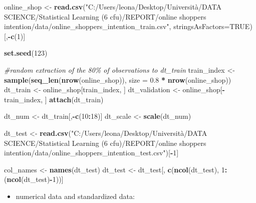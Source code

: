 \documentclass[
]{article}
\newenvironment{Shaded}{\begin{snugshade}}{\end{snugshade}}
\newcommand{\AttributeTok}[1]{\textcolor[rgb]{0.13,0.29,0.53}{#1}}
\newcommand{\CommentTok}[1]{\textcolor[rgb]{0.56,0.35,0.01}{\textit{#1}}}
\newcommand{\ConstantTok}[1]{\textcolor[rgb]{0.56,0.35,0.01}{#1}}
\newcommand{\DecValTok}[1]{\textcolor[rgb]{0.00,0.00,0.81}{#1}}
\newcommand{\FloatTok}[1]{\textcolor[rgb]{0.00,0.00,0.81}{#1}}
\newcommand{\FunctionTok}[1]{\textcolor[rgb]{0.13,0.29,0.53}{\textbf{#1}}}
\newcommand{\NormalTok}[1]{#1}
\newcommand{\OtherTok}[1]{\textcolor[rgb]{0.56,0.35,0.01}{#1}}
\newcommand{\SpecialCharTok}[1]{\textcolor[rgb]{0.81,0.36,0.00}{\textbf{#1}}}
\newcommand{\StringTok}[1]{\textcolor[rgb]{0.31,0.60,0.02}{#1}}
\providecommand{\tightlist}{%
  \setlength{\itemsep}{0pt}\setlength{\parskip}{0pt}}
\begin{document}
\begin{Shaded}
\begin{Highlighting}[]
\NormalTok{online\_shop }\OtherTok{\textless{}{-}} \FunctionTok{read.csv}\NormalTok{(}\StringTok{"C:/Users/leona/Desktop/Università/DATA SCIENCE/Statistical Learning (6 cfu)/REPORT/online shoppers intention/data/online\_shoppers\_intention\_train.csv"}\NormalTok{, }\AttributeTok{stringsAsFactors=}\ConstantTok{TRUE}\NormalTok{)[,}\SpecialCharTok{{-}}\FunctionTok{c}\NormalTok{(}\DecValTok{1}\NormalTok{)]}

\FunctionTok{set.seed}\NormalTok{(}\DecValTok{123}\NormalTok{)}

\CommentTok{\#random extraction of the 80\% of observations to dt\_train}
\NormalTok{train\_index }\OtherTok{\textless{}{-}} \FunctionTok{sample}\NormalTok{(}\FunctionTok{seq\_len}\NormalTok{(}\FunctionTok{nrow}\NormalTok{(online\_shop)), }\AttributeTok{size =} \FloatTok{0.8} \SpecialCharTok{*} \FunctionTok{nrow}\NormalTok{(online\_shop))}
\NormalTok{dt\_train }\OtherTok{\textless{}{-}}\NormalTok{ online\_shop[train\_index, ]}
\NormalTok{dt\_validation }\OtherTok{\textless{}{-}}\NormalTok{ online\_shop[}\SpecialCharTok{{-}}\NormalTok{train\_index, ]}
\FunctionTok{attach}\NormalTok{(dt\_train)}

\NormalTok{dt\_num }\OtherTok{\textless{}{-}}\NormalTok{  dt\_train[,}\SpecialCharTok{{-}}\FunctionTok{c}\NormalTok{(}\DecValTok{10}\SpecialCharTok{:}\DecValTok{18}\NormalTok{)]}
\NormalTok{dt\_scale }\OtherTok{\textless{}{-}} \FunctionTok{scale}\NormalTok{(dt\_num)}


\NormalTok{dt\_test }\OtherTok{\textless{}{-}} \FunctionTok{read.csv}\NormalTok{(}\StringTok{"C:/Users/leona/Desktop/Università/DATA SCIENCE/Statistical Learning (6 cfu)/REPORT/online shoppers intention/data/online\_shoppers\_intention\_test.csv"}\NormalTok{)[}\SpecialCharTok{{-}}\DecValTok{1}\NormalTok{]}

\NormalTok{col\_names }\OtherTok{\textless{}{-}} \FunctionTok{names}\NormalTok{(dt\_test)}
\NormalTok{dt\_test }\OtherTok{\textless{}{-}}\NormalTok{ dt\_test[, }\FunctionTok{c}\NormalTok{(}\FunctionTok{ncol}\NormalTok{(dt\_test), }\DecValTok{1}\SpecialCharTok{:}\NormalTok{(}\FunctionTok{ncol}\NormalTok{(dt\_test)}\SpecialCharTok{{-}}\DecValTok{1}\NormalTok{))]}
\end{Highlighting}
\end{Shaded}

\begin{itemize}
\tightlist
\item
  numerical data and standardized data:
\end{itemize}
\end{document}
